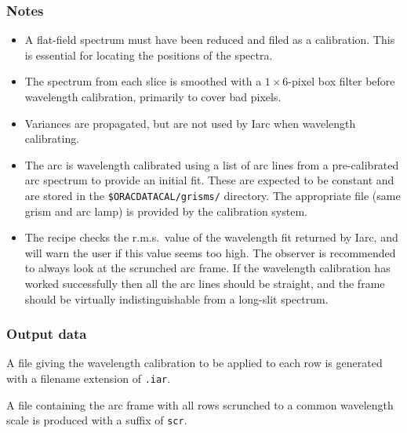\documentclass[twoside,11pt]{article}
\renewcommand{\_}{\texttt{\symbol{95}}}
\begin{document}
\subsubsection*{Notes}\begin{itemize} 

\item 

A flat-field spectrum must have been reduced and filed as a calibration.
This is essential for locating the positions of the spectra.

\item

The spectrum from each slice is smoothed with a $1 \times 6$-pixel box
filter before wavelength calibration, primarily to cover bad pixels.

\item 

Variances are propagated, but are not used by Iarc when wavelength
calibrating. 

\item

The arc is wavelength calibrated using a list of arc lines from a
pre-calibrated arc spectrum to provide an initial fit. These are
expected to be constant and are stored in the {\tt \$ORAC\_DATA\_CAL/grisms/}
directory. The appropriate file (same grism and arc lamp) is provided 
by the calibration system.

\item 

The recipe checks the r.m.s.\ value of the wavelength fit returned by
Iarc, and will warn the user if this value seems too high. The
observer is recommended to always look at the scrunched arc frame. If
the wavelength calibration has worked successfully then all the arc
lines should be straight, and the frame should be virtually
indistinguishable from a long-slit spectrum.


\end{itemize}

\subsubsection*{Output data}

A file giving the wavelength calibration to be applied to each row is
generated with a filename extension of {\tt .iar}. 

A file containing the arc frame with all rows scrunched to a common
wavelength scale is produced with a suffix of {\tt \_scr}.
\end{document}
